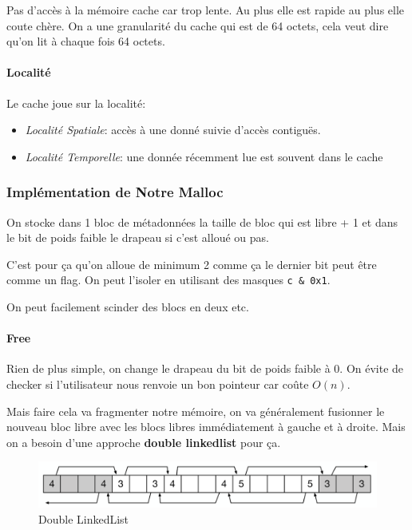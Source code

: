Pas d'accès à la mémoire cache car trop lente. Au plus elle est rapide
au plus elle coute chère. On a une granularité du cache qui est de 64
octets, cela veut dire qu'on lit à chaque fois 64 octets.

\paragraph{Localité}\label{localituxe9}

Le cache joue sur la localité:

\begin{itemize}
\tightlist
\item
  \emph{Localité Spatiale}: accès à une donné suivie d'accès contiguës.
\item
  \emph{Localité Temporelle}: une donnée récemment lue est souvent dans
  le cache
\end{itemize}

\subsubsection{Implémentation de Notre
Malloc}\label{impluxe9mentation-de-notre-malloc}

On stocke dans 1 bloc de métadonnées la taille de bloc qui est libre + 1
et dans le bit de poids faible le drapeau si c'est alloué ou pas.

C'est pour ça qu'on alloue de minimum 2 comme ça le dernier bit peut
être comme un flag. On peut l'isoler en utilisant des masques
\texttt{c\ \&\ 0x1}.

On peut facilement scinder des blocs en deux etc.

\paragraph{Free}\label{free}

Rien de plus simple, on change le drapeau du bit de poids faible à 0. On
évite de checker si l'utilisateur nous renvoie un bon pointeur car coûte
\(O(n)\).

Mais faire cela va fragmenter notre mémoire, on va généralement
fusionner le nouveau bloc libre avec les blocs libres immédiatement à
gauche et à droite. Mais on a besoin d'une approche \textbf{double
linkedlist} pour ça.

\begin{figure}
\centering
\includegraphics{image-50.png}
\caption{Double LinkedList}
\end{figure}

